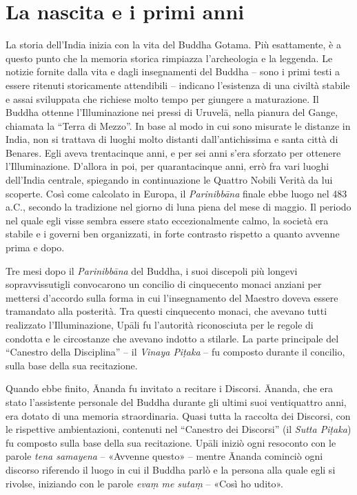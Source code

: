 \chapter{La nascita e i primi anni}

 La storia dell’India inizia con la vita del Buddha
Gotama. Più esattamente, è a questo punto che la memoria storica
rimpiazza l’archeologia e la leggenda. Le notizie fornite dalla vita e
dagli insegnamenti del Buddha – sono i primi testi a essere ritenuti
storicamente attendibili – indicano l’esistenza di una civiltà stabile e
assai sviluppata che richiese molto tempo per giungere a maturazione. Il
Buddha ottenne l’Illuminazione nei pressi di Uruvelā, nella pianura del
Gange, chiamata la “Terra di Mezzo”. In base al modo in cui sono
misurate le distanze in India, non si trattava di luoghi molto distanti
dall’antichissima e santa città di Benares. Egli aveva trentacinque
anni, e per sei anni s’era sforzato per ottenere l’Illuminazione.
D’allora in poi, per quarantacinque anni, errò fra vari luoghi
dell’India centrale, spiegando in continuazione le Quattro Nobili Verità
da lui scoperte. Così come calcolato in Europa, il \emph{Parinibbāna} finale
ebbe luogo nel 483 a.C., secondo la tradizione nel giorno di luna piena
del mese di maggio. Il periodo nel quale egli visse sembra essere stato
eccezionalmente calmo, la società era stabile e i governi ben
organizzati, in forte contrasto rispetto a quanto avvenne prima e dopo.


 Tre mesi dopo il \emph{Parinibbāna} del Buddha, i suoi
discepoli più longevi sopravvissutigli convocarono un concilio di
cinquecento monaci anziani per mettersi d’accordo sulla forma in cui
l’insegnamento del Maestro doveva essere tramandato alla posterità. Tra
questi cinquecento monaci, che avevano tutti realizzato l’Illuminazione,
Upāli fu l’autorità riconosciuta per le regole di condotta e le
circostanze che avevano indotto a stilarle. La parte principale del
“Canestro della Disciplina” – il \emph{Vinaya Piṭaka} – fu composto durante
il concilio, sulla base della sua recitazione.


Quando ebbe finito, Ānanda fu invitato a recitare i Discorsi. Ānanda,
che era stato l’assistente personale del Buddha durante gli ultimi suoi
ventiquattro anni, era dotato di una memoria straordinaria. Quasi tutta
la raccolta dei Discorsi, con le rispettive ambientazioni, contenuti nel
“Canestro dei Discorsi” (il \emph{Sutta Piṭaka}) fu composto sulla base della
sua recitazione. Upāli iniziò ogni resoconto con le parole \emph{tena
samayena} – «Avvenne questo» – mentre Ānanda cominciò ogni discorso
riferendo il luogo in cui il Buddha parlò e la persona alla quale egli
si rivolse, iniziando con le parole \emph{evaṃ me sutaṃ} – «Così ho udito».



